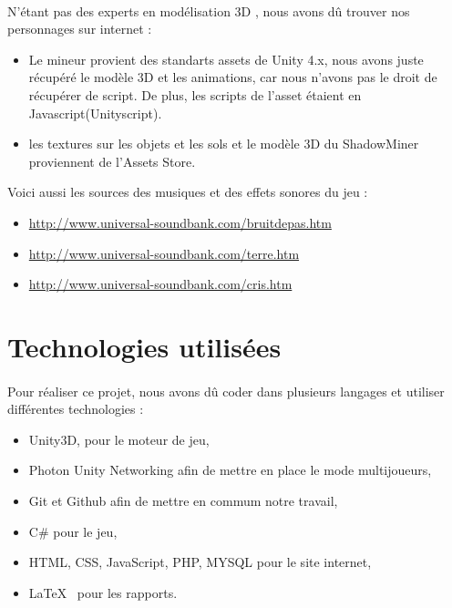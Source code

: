 \documentclass[titlepage, 13px, a4paper]{report}
\begin{document}
\paragraph{} \hspace{0pt}
N'étant pas des experts en modélisation 3D , nous avons dû trouver nos personnages sur internet : 
{\begin{itemize}
	\item Le mineur provient des standarts assets de Unity 4.x, nous avons juste récupéré le modèle 3D et les animations,	
	car nous n'avons pas le droit de récupérer de script. De plus, les scripts de l'asset étaient en Javascript(Unityscript).
	\item les textures sur les objets et les sols et le modèle 3D du ShadowMiner proviennent de l'Assets Store. \\
\end{itemize}} 

Voici aussi les sources des musiques et des effets sonores du jeu : \\
{\begin{itemize}
	\item \url{http://www.universal-soundbank.com/bruitdepas.htm}
	\item \url{http://www.universal-soundbank.com/terre.htm}
	\item \url{http://www.universal-soundbank.com/cris.htm} \\
\end{itemize}} 

\section{Technologies utilisées}
\paragraph{} \hspace{0pt}
Pour réaliser ce projet, nous avons dû coder dans plusieurs langages et utiliser différentes technologies : 
{\begin{itemize}
	\item Unity3D, pour le moteur de jeu,
	\item Photon Unity Networking afin de mettre en place le mode multijoueurs,
	\item Git et Github afin de mettre en commum notre travail,
	\item C\# pour le jeu, 
	\item HTML, CSS, JavaScript, PHP, MYSQL pour le site internet,
	\item \LaTeX ~ pour les rapports. \\
\end{itemize}}
\end{document}
